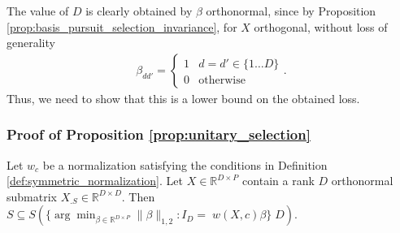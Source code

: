 The value of $D$ is clearly obtained by $\beta$ orthonormal, since by Proposition \ref{prop:basis_pursuit_selection_invariance}, for $X$ orthogonal, without loss of generality 
\begin{align}
\beta_{dd'} = \begin{cases} 1 & d = d' \in \{ 1 \dots D\}  \\
0 & \text{otherwise}
\end{cases}.
\end{align}
Thus, we need to show that this is a lower bound on the obtained loss.


\subsubsection{Proof of Proposition \ref{prop:unitary_selection}}
\label{sec:local_isometry_proof}

 \begin{proposition}
\label{prop:generalized_unitary_selection}
Let $w_c$ be a normalization satisfying the conditions in Definition \ref{def:symmetric_normalization}.
Let $X \in \mathbb R^{D \times P}$ contain a rank $D$ orthonormal submatrix $X_{.S} \in \mathbb R^{D\times D}$.
Then $ S \subseteq S( \{\arg \min_{\beta \in \mathbb R^{D \times P}} \|\beta\|_{1,2} :  I_D = \; w(X,c) \beta\} \; D)$.
 \end{proposition}
 
